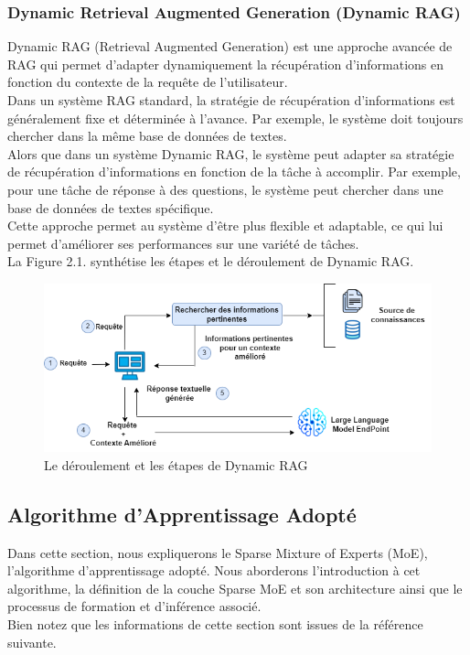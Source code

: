 \subsubsection{Dynamic Retrieval Augmented Generation (Dynamic RAG)}
\justifying
Dynamic RAG (Retrieval Augmented Generation) est une approche avancée de RAG qui permet d'adapter dynamiquement la récupération d'informations en fonction du contexte de la requête de l'utilisateur.\\
Dans un système RAG standard, la stratégie de récupération d'informations est généralement fixe et déterminée à l'avance. Par exemple, le système doit toujours chercher dans la même base de données de textes.\\
Alors que dans un système Dynamic RAG, le système peut adapter sa stratégie de récupération d'informations en fonction de la tâche à accomplir. Par exemple, pour une tâche de réponse à des questions, le système peut chercher dans une base de données de textes spécifique.\\
Cette approche permet au système d'être plus flexible et adaptable, ce qui lui permet d’améliorer ses performances sur une variété de tâches.\\
La Figure 2.1. synthétise les étapes et le déroulement  de Dynamic RAG.

\begin{figure}[H]
    \centering
    \includegraphics[width=\textwidth]{images/chp2/fig1.png}
   \caption{Le déroulement et les étapes de Dynamic RAG}
    \label{fig:deroulement dynamic rag}      
\end{figure}


\subsection{Algorithme d’Apprentissage Adopté}
\justifying
Dans cette section, nous expliquerons le Sparse Mixture of Experts (MoE), l’algorithme d’apprentissage adopté. Nous aborderons l'introduction à cet algorithme, la définition de la couche Sparse MoE et son architecture ainsi que le processus de formation et d'inférence associé.\\
Bien notez que les informations de cette section sont issues de la référence suivante. \cite{moe}

